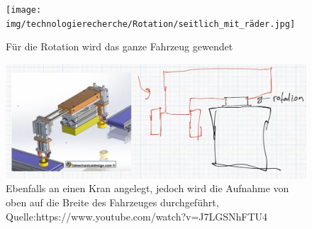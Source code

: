 \begin{figure}[h!]
    \centering
    \begin{minipage}{0.45\textwidth}
        \centering
        \texttt{[image: img/technologierecherche/Rotation/seitlich\_mit\_räder.jpg]}
        \caption{Für die Rotation wird das ganze Fahrzeug gewendet}
        \label{img:tech_seitlich_mit_räder}
    \end{minipage}
    \hfill
    \begin{minipage}{0.45\textwidth}
        \centering
        \includegraphics[width=\textwidth]{img/technologierecherche/Rotation/seitlich_mit_rotation.jpg}
        \caption{Ebenfalls an einen Kran angelegt, jedoch wird die Aufnahme von oben auf die Breite des Fahrzeuges durchgeführt, Quelle:https://www.youtube.com/watch?v=J7LGSNhFTU4} 
        \label{img:tech_seitlich_mit_rotation}
    \end{minipage}
\end{figure}
\newpage
